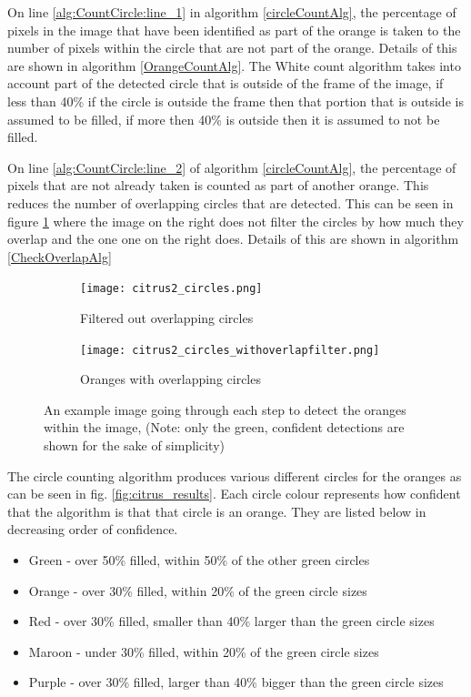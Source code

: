 \documentclass[conference]{IEEEtran}
\begin{document}
On line \ref{alg:CountCircle:line_1} in algorithm \ref{circleCountAlg}, the percentage of pixels in the image that have been identified as part of the orange is taken to the number of pixels within the circle that are not part of the orange. Details of this are shown in algorithm \ref{OrangeCountAlg}. The White count algorithm takes into account part of the detected circle that is outside of the frame of the image, if less than 40\% if the circle is outside the frame then that portion that is outside is assumed to be filled, if more then 40\% is outside then it is assumed to not be filled. 


On line \ref{alg:CountCircle:line_2} of algorithm \ref{circleCountAlg}, the percentage of pixels that are not already taken is counted as part of another orange. This reduces the number of overlapping circles that are detected. This can be seen in figure \ref{overlapComp} where the image on the right does not filter the circles by how much they overlap and the one one on the right does. Details of this are shown in algorithm \ref{CheckOverlapAlg}


\begin{figure}[H]
  \begin{subfigure}{.49\linewidth}
 	 \texttt{[image: citrus2\_circles.png]}\hfill
	 \caption{Filtered out overlapping circles}
  \end{subfigure}
  \begin{subfigure}{.49\linewidth}
  	\texttt{[image: citrus2\_circles\_withoverlapfilter.png]}
   	\caption{Oranges with overlapping circles}
  \end{subfigure}
  \caption{An example image going through each step to detect the oranges within the image, (Note: only the green, confident detections are shown for the sake of simplicity)} \label{overlapComp}
\end{figure}


The circle counting algorithm produces various different circles for the oranges as can be seen in fig. \ref{fig:citrus_results}. Each circle colour represents how confident that the algorithm is that that circle is an orange. They are listed below in decreasing order of confidence.

\begin{itemize}
\item Green - over 50\% filled, within 50\% of the other green circles
\item Orange - over 30\% filled, within 20\% of the green circle sizes
\item Red - over 30\% filled, smaller than 40\% larger than the green circle sizes
\item Maroon - under 30\% filled,  within 20\% of the green circle sizes
\item Purple - over 30\% filled, larger  than 40\% bigger than the green circle sizes
\end{itemize}
\end{document}
